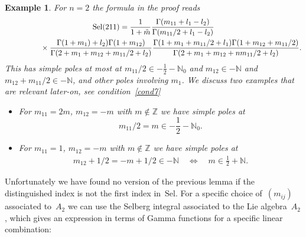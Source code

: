 \documentclass[pdftex]{sigma}%
\numberwithin{equation}{section}
\newtheorem{ese}[teo]{Example}
\newcommand{\N}{\mathbb{N}}
\newcommand{\Z}{\mathbb{Z}}
\newcommand{\Sel}{\mathrm{Sel}}
\begin{document}
\begin{ese}For $n=2$ the formula in the proof reads
	\begin{gather*}
	 \Sel(211)
	=\frac{1}{1+\tilde{m}}\frac{\Gamma(m_{11}+l_1-l_2)}{\Gamma(m_{11}/2+l_1-l_2)} \\
\hphantom{\Sel(211)=}{}
\times \frac{\Gamma(1+m_1)+l_2)\Gamma(1+m_{12})}
	{\Gamma(2+m_1+m_{12}+m_{11}/2+l_2)}
	\frac{\Gamma(1+m_1+m_{11}/2+l_1)\Gamma(1+m_{12}+m_{11}/2)}
	{\Gamma(2+m_1+m_{12}+nm_{11}/2+l_2)}.
	\end{gather*}
	This has simple poles at most at $m_{11}/2\in -\frac{1}{2}-\N_0$ and $m_{12}\in -\N$ and $m_{12}+m_{11}/2\in -\N$, and other poles involving $m_1$. We discuss two examples that are relevant later-on, see condition~\eqref{cond7}
	\begin{itemize}\itemsep=0pt
		\item For $m_{11}=2m$, $m_{12}=-m$ with $m\not\in \Z$ we have simple poles at \[m_{11}/2=m\in -\frac{1}{2}-\N_0.\]
		\item For $m_{11}=1$, $m_{12}=-m$ with $m\not\in \Z$ we have simple poles at
		\begin{gather*}
	m_{12}+1/2=-m+1/2  \in -\N\quad
			\Leftrightarrow\quad m \in\frac{1}{2}+\N.
		\end{gather*}
	\end{itemize}
\end{ese}

Unfortunately we have found no version of the previous lemma if the distinguished index is not the first index in~$\Sel$. For a specific choice of~$(m_{ij})$ associated to~$A_2$ we can use the Selberg integral associated to the Lie algebra~$A_2$ \cite{TV03,War09}, which gives an expression in terms of Gamma functions for a specific linear combination:
\end{document}
